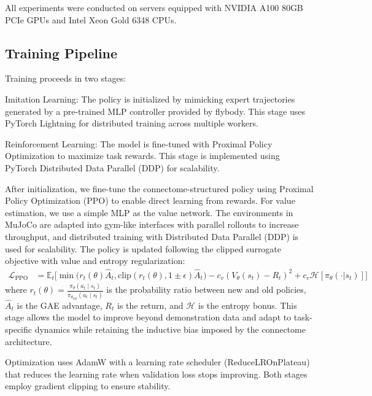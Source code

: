 \documentclass[a4paper]{easychair}
\begin{document}
All experiments were conducted on servers equipped with NVIDIA A100 80GB PCIe GPUs and Intel Xeon Gold 6348 CPUs.

\subsection{Training Pipeline}

Training proceeds in two stages:

Imitation Learning: The policy is initialized by mimicking expert trajectories generated by a pre-trained MLP controller provided by flybody. This stage uses PyTorch Lightning for distributed training across multiple workers.

Reinforcement Learning: The model is fine-tuned with Proximal Policy Optimization to maximize task rewards. This stage is implemented using PyTorch Distributed Data Parallel (DDP) for scalability.

After initialization, we fine-tune the connectome-structured policy using Proximal Policy Optimization (PPO) to enable direct learning from rewards. For value estimation, we use a simple MLP as the value network. The environments in MuJoCo are adapted into gym-like interfaces with parallel rollouts to increase throughput, and distributed training with Distributed Data Parallel (DDP) is used for scalability. The policy is updated following the clipped surrogate objective with value and entropy regularization:
\begin{equation}
\begin{aligned}
\mathcal{L}_{\text{PPO}} &= \mathbb{E}_t \Big[ \min\big(r_t(\theta) \hat{A}_t, \text{clip}(r_t(\theta), 1\pm\epsilon)\hat{A}_t\big) - c_v (V_\theta(s_t) - R_t)^2 + c_e \mathcal{H}[\pi_\theta(\cdot|s_t)] \Big]
\end{aligned}
\end{equation}
where $ r_t(\theta)=\frac{\pi_\theta(a_t \mid s_t)}{\pi_{\theta_{\text{old}}}(a_t \mid s_t)} $ is the probability ratio between new and old policies, $\hat{A}_t$ is the GAE advantage, $R_t$ is the return, and $\mathcal{H}$ is the entropy bonus. This stage allows the model to improve beyond demonstration data and adapt to task-specific dynamics while retaining the inductive bias imposed by the connectome architecture.

Optimization uses AdamW with a learning rate scheduler (ReduceLROnPlateau) that reduces the learning rate when validation loss stops improving. Both stages employ gradient clipping to ensure stability.
\end{document}
